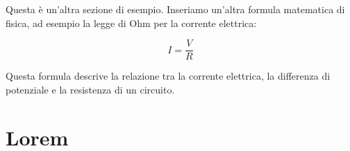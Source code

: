 \documentclass[a4paper,11pt]{article}
\begin{document}
\begin{multicols}{3}
		Questa è un'altra sezione di esempio. Inseriamo un'altra formula matematica di fisica, ad esempio la legge di Ohm per la corrente elettrica:
		
		\begin{equation}
			I=\frac{V}{R}
		\end{equation}
		
		Questa formula descrive la relazione tra la corrente elettrica, la differenza di potenziale e la resistenza di un circuito.
		
		
		\section{Lorem}
		\lipsum[1-10]
	\end{multicols}
	
\end{document}
